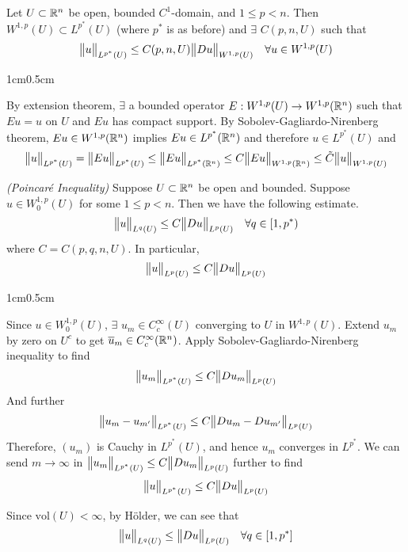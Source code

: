 \documentclass[12pt,a4paper]{report}
\newenvironment{proof}
{\begin{changemargin}{1cm}{0.5cm} 
	}%
	{\end{changemargin}
}
\begin{document}
 Let $U \subset \mathbb{R}^n$ be open, bounded $C^1$-domain, and $1\leq p<n$. Then $W^{1,p}(U) \subset L^{p^*}(U)$ (where $p^*$ is as before) and $\exists$ $C(p,n,U)$ such that
\begin{align*}
\bigl\lVert u\bigr\rVert_{L^{p^*}(U)} \leq C(p,n,U) \bigl\lVert Du\bigr\rVert_{W^{1,p} (U)} \quad \forall u \in W^{1,p}(U)
\end{align*} 
\begin{proof}
\pf By extension theorem, $\exists$ a bounded operator $E: W^{1,p}(U) \rightarrow W^{1,p}(\mathbb{R}^n)$ such that $Eu = u$ on $U$ and $Eu$ has compact support. By Sobolev-Gagliardo-Nirenberg theorem, $Eu \in W^{1,p}(\mathbb{R}^n)$ implies $Eu \in L^{p^*} (\mathbb{R}^n)$ and therefore $u \in L^{p^*}(U)$ and
\begin{align*}
\bigl\lVert u\bigr\rVert_{L^{p^*}(U)} = \bigl\lVert Eu\bigr\rVert_{L^{p^*}(U)} \leq \bigl\lVert Eu\bigr\rVert_{L^{p^*}(\mathbb{R}^n)} \leq C \bigl\lVert Eu\bigr\rVert_{W^{1,p}(\mathbb{R}^n)} \leq \tilde{C}\bigl\lVert u\bigr\rVert_{W^{1,p}(U)}
\end{align*}

\eop
\end{proof}
\s

 \emph{(Poincar\'{e} Inequality)} Suppose $U\subset \mathbb{R}^n$ be open and bounded. Suppose $u \in W_0^{1,p}(U)$ for some $1\leq p<n$. Then we have the following estimate.
\begin{align*}
\bigl\lVert u\bigr\rVert_{L^q (U)} \leq C\bigl\lVert Du\bigr\rVert_{L^p(U)} \quad \forall q \in [1,p^*)
\end{align*}
where $C = C(p,q,n,U)$. In particular,
\begin{align*}
\bigl\lVert u\bigr\rVert_{L^{p}(U)} \leq C \bigl\lVert Du\bigr\rVert_{L^p(U)}
\end{align*}
\begin{proof}
\pf Since $u \in W^{1,p}_0(U)$, $\exists$ $u_m \in C_c^{\infty}(U)$ converging to $U$ in $W^{1,p}(U)$. Extend $u_m$ by zero on $U^c$ to get $\overline{u}_m \in C^{\infty}_c (\mathbb{R}^n)$. Apply Sobolev-Gagliardo-Nirenberg inequality to find
\begin{align*}
\bigl\lVert u_m\bigr\rVert_{L^{p^*}(U)} \leq C \bigl\lVert Du_m\bigr\rVert_{L^p(U)}
\end{align*}
And further
\begin{align*}
\bigl\lVert u_m - u_{m'}\bigr\rVert_{L^{p^*}(U)} \leq C \bigl\lVert Du_m - Du_{m'}\bigr\rVert_{L^p(U)}
\end{align*}
Therefore, $(u_m)$ is Cauchy in $L^{p^*}(U)$, and hence $u_m$ converges in $L^{p^*}$. We can send $m\rightarrow \infty$ in $\bigl\lVert u_m\bigr\rVert_{L^{p^*}(U)} \leq C \bigl\lVert Du_m\bigr\rVert_{L^p(U)}$ further to find
\begin{align*}
\bigl\lVert u\bigr\rVert_{L^{p^*}(U)} \leq C \bigl\lVert Du\bigr\rVert_{L^p(U)}
\end{align*}

Since $\text{vol}(U) < \infty$, by H\"{o}lder, we can see that
\begin{align*}
\bigl\lVert u\bigr\rVert_{L^q(U)} \leq \bigl\lVert Du\bigr\rVert_{L^p(U)}  \quad \forall q \in [1,p^*]
\end{align*}
\eop
\end{proof}
\s
\end{document}
